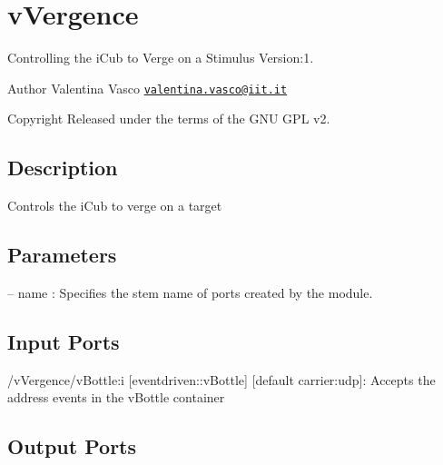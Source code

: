 \hypertarget{group__vVergence}{}\section{v\+Vergence}
\label{group__vVergence}
Controlling the i\+Cub to Verge on a Stimulus Version\+:1. \begin{DoxyAuthor}{Author}
Valentina Vasco \href{mailto:valentina.vasco@iit.it}{\tt valentina.\+vasco@iit.\+it} ~\newline
 
\end{DoxyAuthor}
\begin{DoxyCopyright}{Copyright}
Released under the terms of the G\+NU G\+PL v2. 
\end{DoxyCopyright}
\hypertarget{group__zynqGrabber_intro_sec}{}\subsection{Description}\label{group__zynqGrabber_intro_sec}
Controls the i\+Cub to verge on a target\hypertarget{group__zynqGrabber_parameters_sec}{}\subsection{Parameters}\label{group__zynqGrabber_parameters_sec}

\begin{DoxyItemize}
\item -- name \+: Specifies the stem name of ports created by the module. 
\end{DoxyItemize}\hypertarget{group__zynqGrabber_inputports_sec}{}\subsection{Input Ports}\label{group__zynqGrabber_inputports_sec}

\begin{DoxyItemize}
\item /v\+Vergence/v\+Bottle\+:i \mbox{[}eventdriven\+::v\+Bottle\mbox{]} \mbox{[}default carrier\+:udp\mbox{]}\+: Accepts the address events in the v\+Bottle container
\end{DoxyItemize}\hypertarget{group__zynqGrabber_outputports_sec}{}\subsection{Output Ports}\label{group__zynqGrabber_outputports_sec}

